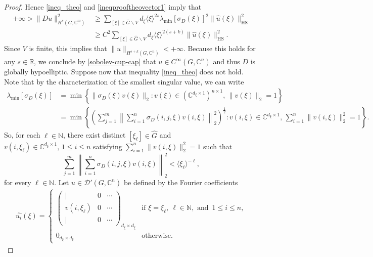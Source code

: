\documentclass[10pt,a4paper]{amsart}
\newcommand{\C}{\mathbb{C}}
\newcommand{\HS}{\operatorname{HS}}
\newcommand{\N}{\mathbb{N}}
\begin{document}
\begin{proof}
        Hence \eqref{ineq_theo} and \eqref{ineqprooftheovector1} imply that
    \begin{align*}    
         +\infty>\|Du\|^2_{H^s(G,\C^m)}&\geq\sum_{[\xi]\in \widehat{G}\backslash V} d_\xi\langle\xi\rangle^{2s} \lambda_{\min}[\sigma_D(\xi)]^2\|\widehat{u}(\xi)\|_{\HS}^2\\
        & \geq C^2\sum_{[\xi]\in \widehat{G}\backslash V}d_\xi\langle\xi\rangle^{2(s+k)}\|\widehat{u}(\xi)\|_{\HS}^2.
    \end{align*}
    Since $V$ is finite, this implies that $\|u\|_{H^{s+k}(G,\C^n)}<+\infty$. Because this holds for any $s\in\mathbb{R}$, we conclude by \eqref{sobolev-cup-cap} that $u\in C^\infty(G,\C^n)$ and thus $D$ is globally hypoelliptic. 
     Suppose now that inequality \eqref{ineq_theo} does not hold. Note that by the characterization of the smallest singular value, we can write 
     \begin{align*}
         \lambda_{\min}[\sigma_D(\xi)]&=\min\left\{ \|\sigma_D(\xi)v(\xi)\|_2:v(\xi)\in (\C^{d_\xi\times 1})^{n\times 1},\,\|v(\xi)\|_2=1 \right\}\\
         &=\min\left\{\left(\sum_{j=1}^m\left\|\sum_{i=1}^n\sigma_D(i,j,\xi)v(i,\xi)\right\|_2^2\right)^{\frac{1}{2}}:v(i,\xi)\in \C^{d_\xi\times 1},\,\sum_{i=1}^n\|v(i,\xi)\|_2^2=1 \right\}.
     \end{align*}
     So, for each $\ell\in\mathbb{N}$, there exist distinct $[\xi_\ell]\in\widehat{G}$ and $v(i,\xi_\ell) \in \C^{d_\xi\times 1},\,1\leq i\leq n$ satisfying $\sum_{i=1}^n\|v(i,\xi)\|_2^2=1$  such that
    \begin{equation*}
\sum_{j=1}^m\left\|\sum_{i=1}^n\sigma_D(i,j,\xi)v(i,\xi)\right\|_2^2< \langle \xi_\ell\rangle^{-\ell},
    \end{equation*}
    for every $\ell\in \N$. Let $u\in \mathcal{D}'(G,\C^n)$ be defined by the Fourier coefficients
    \begin{align*}
        \widehat{u_i}(\xi) =\begin{cases}
            \begin{pmatrix}
                \lvert&0&\cdots\\
                v(i,\xi_\ell)&0&\cdots\\
                \lvert&0&\cdots
            \end{pmatrix}_{d_\xi\times d_\xi}&\text{if } \xi=\xi_\ell,\ \ell\in\N, \text{ and }\,1\leq i\leq n,\\
            0_{d_\xi\times d_\xi}&\text{otherwise.}

\end{cases}
\end{align*}
\end{proof}
\end{document}
